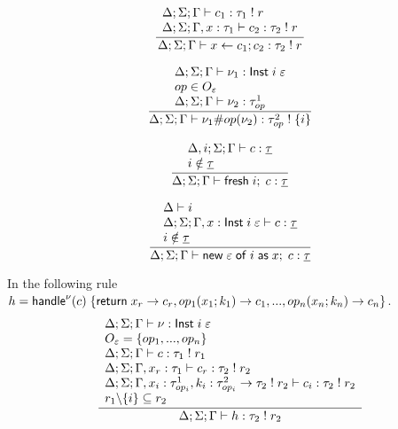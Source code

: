 \[\frac{
	\begin{array}{l}
	\Delta;\Sigma;\Gamma \vdash c_1 : \tau_1 \; ! \; r \\
	\Delta;\Sigma;\Gamma,x:\tau_1 \vdash c_2 : \tau_2 \; ! \; r \\
	\end{array}
}{
	\Delta;\Sigma;\Gamma \vdash x \leftarrow c_1 ; c_2 : \tau_2 \; ! \; r
}\]

\[\frac{
	\begin{array}{l}
	\Delta;\Sigma;\Gamma \vdash \nu_1 : \mathsf{Inst} \; i \; \varepsilon \\
	op \in O_\varepsilon \\
	\Delta;\Sigma;\Gamma \vdash \nu_2 : \tau^1_{op}
	\end{array}
}{
	\Delta;\Sigma;\Gamma \vdash \nu_1 \# op(\nu_2) : \tau^2_{op} \; ! \; \{i\}
}\]

\[\frac{
	\begin{array}{l}
	\Delta,i;\Sigma;\Gamma \vdash c : \underline{\tau} \\
	i \notin \underline{\tau}
	\end{array}
}{
	\Delta;\Sigma;\Gamma \vdash \mathsf{fresh} \; i ;\; c : \underline{\tau}
}\]

\[\frac{
	\begin{array}{l}
	\Delta \vdash i \\
	\Delta;\Sigma;\Gamma,x:\mathsf{Inst} \; i \; \varepsilon \vdash c : \underline{\tau} \\
	i \notin \underline{\tau}
	\end{array}
}{
	\Delta;\Sigma;\Gamma \vdash \mathsf{new} \; \varepsilon \; \mathsf{of} \; i \; \mathsf{as} \; x ;\; c : \underline{\tau}
}\]

In the following rule \\$h = 
	\mathsf{handle}^{\nu} ( c ) \; \{
		\mathsf{return} \; x_r \rightarrow c_r,
		op_1(x_1 ; k_1) \rightarrow c_1,
		...,
		op_n(x_n ; k_n) \rightarrow c_n
	\}$.\\
\[\frac{
	\begin{array}{l}
	\Delta;\Sigma;\Gamma \vdash \nu : \mathsf{Inst} \; i \; \varepsilon \\
	O_\varepsilon = \{ op_1, ..., op_n \} \\
	\Delta;\Sigma;\Gamma \vdash c : \tau_1 \; ! \; r_1 \\
	\Delta;\Sigma;\Gamma, x_r : \tau_1 \vdash c_r : \tau_2 \; ! \; r_2 \\
	\Delta;\Sigma;\Gamma, x_i : \tau^1_{op_i}, k_i : \tau^2_{op_i} \rightarrow \tau_2 \; ! \; r_2 \vdash c_i : \tau_2 \; ! \; r_2 \\
	r_1 \backslash \{ i \} \subseteq r_2 \\
	\end{array}
}{
	\Delta;\Sigma;\Gamma \vdash h : \tau_2 \; ! \; r_2
}\]

